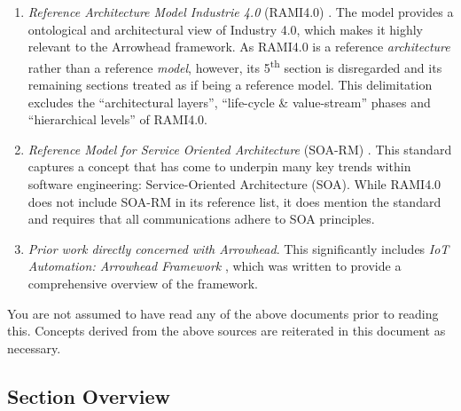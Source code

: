 \begin{enumerate}
\item \textit{Reference Architecture Model Industrie 4.0} (RAMI4.0) \cite{adolphs2016reference}.
The model provides a ontological and architectural view of Industry 4.0, which makes it highly relevant to the Arrowhead framework.
As RAMI4.0 is a reference \textit{architecture} rather than a reference \textit{model}, however, its 5\textsuperscript{th} section is disregarded and its remaining sections treated as if being a reference model.
This delimitation excludes the ``architectural layers'', ``life-cycle \& value-stream'' phases and ``hierarchical levels'' of RAMI4.0.

\item \textit{Reference Model for Service Oriented Architecture} (SOA-RM) \cite{mackenzie2006reference}.
This standard captures a concept that has come to underpin many key trends within software engineering: Service-Oriented Architecture (SOA).
While RAMI4.0 does not include SOA-RM in its reference list, it does mention the standard and requires that all communications adhere to SOA principles. 

\item \textit{Prior work directly concerned with Arrowhead}.
This significantly includes \textit{IoT Automation: Arrowhead Framework} \cite{delsing2017iot}, which was written to provide a comprehensive overview of the framework.

\end{enumerate}

You are not assumed to have read any of the above documents prior to reading this.
Concepts derived from the above sources are reiterated in this document as necessary.

\subsection{Section Overview}
\label{sec:introduction:sections}

